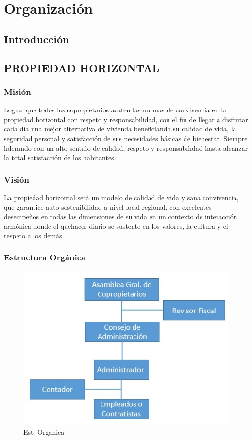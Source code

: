 \chapter{Organización}
\section{Introducción}
\newpage
\section{PROPIEDAD HORIZONTAL}

\subsection{Misión}

Lograr que todos los copropietarios acaten las normas de convivencia en la propiedad horizontal con respeto y responsabilidad, con el fin de llegar a disfrutar cada día una mejor alternativa de vivienda beneficiando su calidad de vida, la seguridad personal y satisfacción de sus necesidades básicas de bienestar. Siempre liderando con un alto sentido de calidad, respeto y responsabilidad hasta alcanzar la total satisfacción de los habitantes.

\subsection{Visión}

La propiedad horizontal será un modelo de calidad de vida y sana convivencia, que garantice auto sostenibilidad a nivel local regional, con excelentes desempeños en todas las dimensiones de su vida en un contexto de interacción armónica donde el quehacer diario se sustente en los valores, la cultura y el respeto a los demás.


\subsection{Estructura Orgánica}


\begin{figure}[th!]
	\centering
	\includegraphics[width=0.7\linewidth]{arquitectura/organizacion/imgs/organigrama}
	\caption{Est. Organica}	
\end{figure}



